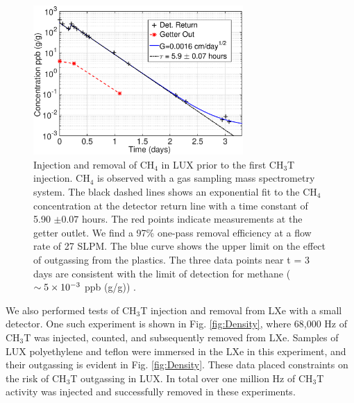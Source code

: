\begin{figure}[h!]
\includegraphics[width=80mm]{fig/July_CH4_wOG.eps}
\caption{Injection and removal of CH$_4$ in LUX prior to the first CH$_3$T injection. CH$_4$ is observed with a gas sampling mass spectrometry system. The black dashed lines shows an exponential fit to the CH$_4$ concentration at the detector return line with a time constant of 5.90 $\pm 0.07$ hours.  The red points indicate measurements at the getter outlet. We find a 97\% one-pass removal efficiency at a flow rate of 27 SLPM. The blue curve shows the upper limit on the effect of outgassing from the plastics. The three data points near t = 3 days are consistent with the limit of detection for methane ($\sim \rm 5\times10^{-3}$ ppb (g/g)) .}
\label{fig:ch4_removal}
\end{figure}

We also performed tests of CH$_3$T injection and removal from LXe with a small detector. One such experiment is shown in Fig. \ref{fig:Density}, where 68,000 Hz of CH$_3$T was injected, counted, and subsequently removed from LXe. Samples of LUX polyethylene and teflon were immersed in the LXe in this experiment, and their outgassing is evident in Fig. \ref{fig:Density}. These data placed constraints on the risk of CH$_3$T outgassing in LUX. In total over one million Hz of CH$_3$T activity was injected and successfully removed in these experiments.

